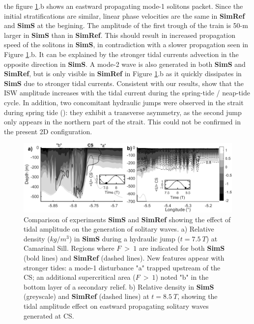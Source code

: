 the figure \ref{fig_cv_spring}.b shows an eastward propagating mode-1 solitons packet. Since the initial stratifications are similar, linear phase velocities are the same in \textbf{SimRef} and \textbf{SimS} at the begining. The amplitude of the first trough of the train is 50-m larger in \textbf{SimS} than in \textbf{SimRef}. This should result in increased propagation speed of the solitons in \textbf{SimS}, in contradiction with a slower propagation seen in Figure \ref{fig_cv_spring}.b. It can be explained by the stronger tidal currents advection in the opposite direction in \textbf{SimS}. A mode-2 wave is also generated in both \textbf{SimS} and \textbf{SimRef}, but is only visible in \textbf{SimRef} in Figure \ref{fig_cv_spring}.b as it quickly dissipates in \textbf{SimS} due to stronger tidal currents.
Consistent with our results, \citet{FA1988} show that the ISW amplitude increases with the tidal current during the spring-tide / neap-tide cycle. In addition,  two concomitant hydraulic jumps were observed in the strait during spring tide (\citep{SG2011}): they exhibit a transverse asymmetry, as the second jump only appears in the northern part of the strait. This could not be confirmed in the present 2D configuration.

\begin{figure}[!h]
  \centering
  \includegraphics[width=1\textwidth]{./GBR2D/figure10.png}
  \caption[Comparison of experiments \textbf{SimS} and \textbf{SimRef} showing the effect of tidal amplitude on the generation of solitary waves.]{Comparison of experiments \textbf{SimS} and \textbf{SimRef} showing the effect of tidal amplitude on the generation of solitary waves. a) Relative density ($kg/m^3$) in \textbf{SimS} during a hydraulic jump ($t = 7.5\ T$) at Camarinal Sill. Regions where $F\ >\ 1$ are indicated for both \textbf{SimS} (bold lines) and \textbf{SimRef} (dashed lines). New features appear with stronger tides: a mode-1 disturbance "a" trapped upstream of the CS; an additional supercritical area ($F\ >\ 1$) noted "b" in the bottom layer of a secondary relief. b) Relative density in \textbf{SimS} (greyscale) and \textbf{SimRef} (dashed lines) at $t = 8.5\ T$, showing the tidal amplitude effect on eastward propagating solitary waves generated at CS.}
  \label{fig_cv_spring}
\end{figure}


